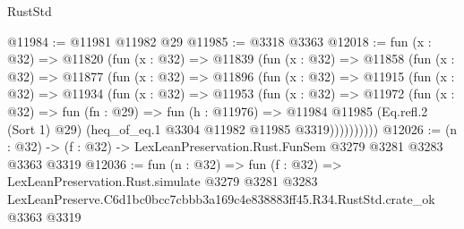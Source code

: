\begin{lexlean}{RustStd}
\begin{coremodule}
@11984 := @11981 @11982 @29
@11985 := @3318 @3363
@12018 := fun (x : @32) =>
  @11820
    (fun (x : @32) =>
    @11839
      (fun (x : @32) =>
      @11858
        (fun (x : @32) =>
        @11877
          (fun (x : @32) =>
          @11896
            (fun (x : @32) =>
            @11915
              (fun (x : @32) =>
              @11934
                (fun (x : @32) =>
                @11953
                  (fun (x : @32) =>
                  @11972
                    (fun (x : @32) =>
                    fun (fn : @29) =>
                    fun (h : @11976) =>
                    @11984
                      @11985
                      (Eq.refl.{2} (Sort 1) @29)
                      (heq_of_eq.{1} @3304 @11982 @11985 @3319))))))))))
@12026 := (n : @32) -> (f : @32) -> LexLeanPreservation.Rust.FunSem @3279 @3281 @3283 @3363 @3319
@12036 := fun (n : @32) =>
  fun (f : @32) =>
  LexLeanPreservation.Rust.simulate
    @3279
    @3281
    @3283
    LexLeanPreserve.C6d1bc0bcc7cbbb3a169c4e838883ff45.R34.RustStd.crate_ok
    @3363
    @3319
\end{coremodule}
\end{lexlean}
